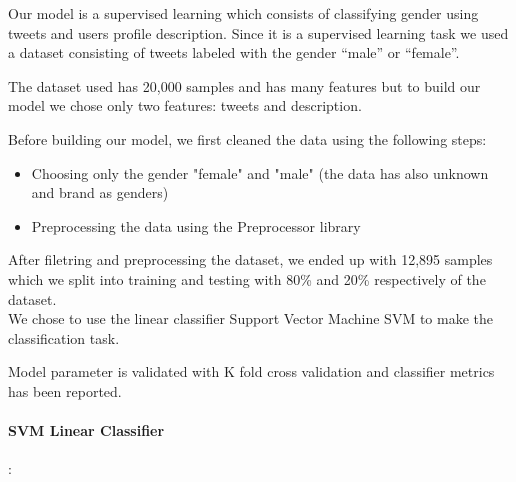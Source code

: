 \documentclass[11pt,french,english]{article}
\begin{document}
\setlength{\parskip}{0.3cm} \setlength{\parindent}{0cm}

\begin{center}
\textbf{}
\par\end{center}{\large \par}

\begin{center}
\textbf{\LARGE{}}
\par\end{center}{\LARGE \par}

Our model is a supervised learning which consists of classifying gender using tweets and users profile description. 
Since it is a supervised learning task we used a dataset consisting of tweets labeled with the gender “male” or “female”.

The dataset used has 20,000 samples and has many features but to build our model we chose only two features: tweets and description.

Before building our model, we first cleaned the data using the following steps:
\begin{itemize}
    \item Choosing only the gender "female" and "male" (the data has also unknown and brand as genders)
    \item Preprocessing the data using the Preprocessor library
\end{itemize}

After filetring and preprocessing the dataset, we ended up with 12,895 samples which we split into training and testing with 80\% and 20\% respectively of the dataset.  \\
We chose to use the linear classifier Support Vector Machine SVM to make the classification task.

Model parameter is validated with K fold cross validation and classifier metrics has been reported.

\paragraph{SVM Linear Classifier}: 
\end{document}
